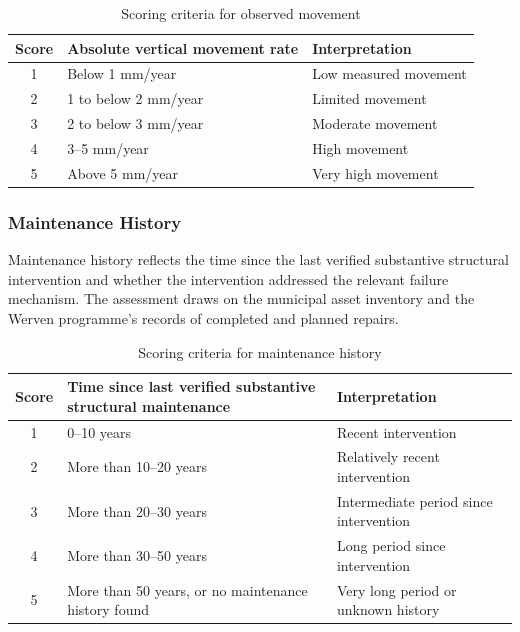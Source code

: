 \begin{table}[htbp]
    \centering
    \caption{Scoring criteria for observed movement}
    \vspace{2mm}
    \begin{tabularx}{\textwidth}{c X X}
        \toprule
        \textbf{Score} & \textbf{Absolute vertical movement rate} & \textbf{Interpretation} \\
        \midrule
        1 & Below 1 mm/year & Low measured movement \\
        2 & 1 to below 2 mm/year & Limited movement \\
        3 & 2 to below 3 mm/year & Moderate movement \\
        4 & 3–5 mm/year & High movement \\
        5 & Above 5 mm/year & Very high movement \\
        \bottomrule
    \end{tabularx}
\end{table}

\subsubsection{Maintenance History}

Maintenance history reflects the time since the last verified substantive structural intervention and whether the intervention addressed the relevant failure mechanism. The assessment draws on the municipal asset inventory and the Werven programme's records of completed and planned repairs.

\begin{table}[htbp]
    \centering
    \caption{Scoring criteria for maintenance history}
    \vspace{2mm}
    \begin{tabularx}{\textwidth}{c X X}
        \toprule
        \textbf{Score} & \textbf{Time since last verified substantive structural maintenance} & \textbf{Interpretation} \\
        \midrule
        1 & 0–10 years & Recent intervention \\
        2 & More than 10–20 years & Relatively recent intervention \\
        3 & More than 20–30 years & Intermediate period since intervention \\
        4 & More than 30–50 years & Long period since intervention \\
        5 & More than 50 years, or no maintenance history found & Very long period or unknown history \\
        \bottomrule
    \end{tabularx}
\end{table}

